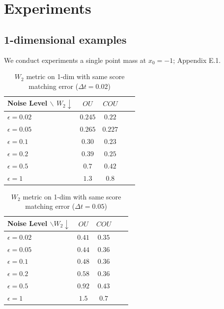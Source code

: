 \documentclass[letterpaper,11pt,reqno]{amsart}
\numberwithin{equation}{section}
\begin{document}
\section{Experiments}
\label{sc4}
\subsection{1-dimensional examples} 
\label{sc41}
We conduct experiments a single point mass at $x_0=-1$; Appendix E.1.

\begin{table}[!htbp]
\centering
\begin{tabular}{l c c c c}
    \toprule
        Noise Level $\backslash$ $W_2\downarrow$ & $OU$ & $COU$ \\
        \midrule
        $\epsilon = 0.02$ ~& $0.245$ & $0.22$\\

         $\epsilon = 0.05$ & $0.265$ & $0.227$\\
         $\epsilon = 0.1$ & $0.30$ & $0.23$\\
         $\epsilon = 0.2$ & $0.39$ & $0.25$\\
         $\epsilon = 0.5$ & $0.7$ & $0.42$\\
         $\epsilon = 1$ & $1.3$ & $0.8$\\
         \bottomrule
\end{tabular}
\caption{$W_2$ metric on 1-dim with same score matching error ($\Delta t= 0.02$) }
\end{table}

\begin{table}[!htbp]
\centering
\begin{tabular}{l c c c c}
    \toprule
        Noise Level $\backslash W_2\downarrow$ & $OU$ & $COU$ \\
        \midrule
        $\epsilon = 0.02$ ~& $0.41$ & $0.35$\\

         $\epsilon = 0.05$ & $0.44$ & $0.36$\\
         $\epsilon = 0.1$ & $0.48$ & $0.36$\\
         $\epsilon = 0.2$ & $0.58$ & $0.36$\\
         $\epsilon = 0.5$ & $0.92$ & $0.43$\\
         $\epsilon = 1$ & $1.5$ & $0.7$\\
         \bottomrule
\end{tabular}
\caption{$W_2$ metric on 1-dim with same score matching error ($\Delta t= 0.05$)}
\end{table}
\end{document}
